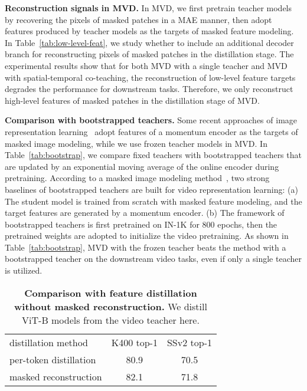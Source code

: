 \documentclass[10pt,twocolumn,letterpaper]{article}
\makeatletter
\newcommand*{\system}{MVD\@\xspace}
\makeatother
\begin{document}
\vspace{0.05in}
\noindent \textbf{Reconstruction signals in \system.} In MVD, we first pretrain teacher models by recovering the pixels of masked patches in a MAE manner, then adopt features produced by teacher models as the targets of masked feature modeling. In Table~\ref{tab:low-level-feat}, we study whether to include an additional decoder branch for reconstructing pixels of masked patches in the distillation stage. The experimental results show that for both MVD with a single teacher and MVD with spatial-temporal co-teaching, the reconstruction of low-level feature targets degrades the performance for downstream tasks. Therefore, we only reconstruct high-level features of masked patches in the distillation stage of MVD.

\vspace{0.05in}
\noindent \textbf{Comparison with bootstrapped teachers.} Some recent approaches of image representation learning~\cite{zhou2021ibot,bootmae,chen2022sdae,dong2022maskclip} adopt features of a momentum encoder as the targets of masked image modeling, while we use frozen teacher models in MVD. In Table~\ref{tab:bootstrap}, we compare fixed teachers with bootstrapped teachers that are updated by an exponential moving average of the online encoder during pretraining. According to a masked image modeling method~\cite{bootmae}, two strong baselines of bootstrapped teachers are built for video representation learning: (a) The student model is trained from scratch with masked feature modeling, and the target features are generated by a momentum encoder. (b) The framework of bootstrapped teachers is first pretrained on IN-1K for 800 epochs, then the pretrained weights are adopted to initialize the video pretraining. As shown in Table~\ref{tab:bootstrap}, MVD with the frozen teacher beats the method with a bootstrapped teacher on the downstream video tasks, even if only a single teacher is utilized. 

\begin{table}[t]
\centering
\begin{tabular}{l|c|c}
distillation method &  K400 top-1 &  SSv2 top-1  \\
\shline
per-token distillation & 80.9 &  70.5  \\
masked reconstruction & 82.1  & 71.8  \\

\end{tabular}
\caption{\textbf{Comparison with feature distillation without masked reconstruction.} We distill ViT-B models from the video teacher here.}
\label{tab:feat_distill}
\vspace{-5pt}
\end{table}
\end{document}
